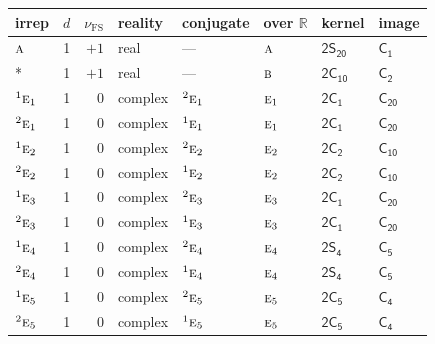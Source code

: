 \documentclass[10pt,a4paper]{article}
\numberwithin{equation}{section}
\newcommand{\grp}[1]{\mathsf{#1}}
\newcommand{\irr}[1]{\text{\normalfont\scshape #1}}
\newcommand{\conjpair}[1]{{}^{#1}}
\newcommand{\detbox}[1]{{\setlength{\fboxsep}{1pt}\fbox{#1}}}
\newcommand{\fsind}{\nu_{\mathrm{FS}}}
\begin{document}
{\small\renewcommand{\arraystretch}{1.25}\setlength{\tabcolsep}{4pt}\begin{longtable}{@{}lrrlllll@{}}\toprule
irrep & $d$ & $\fsind$ & reality & conjugate & over $\mathbb{R}$ & kernel & image\\\midrule\endhead
\bottomrule\endfoot\endlastfoot
$\irr{a}$ & 1 & $+1$ & real & --- & $\irr{a}$ & \href{2S20.pdf}{$\grp{2S_{20}}$} & \href{../../../rotation/data/pdf/C1.pdf}{$\grp{C_{1}}$}\\*
\detbox{$\irr{b}$} & 1 & $+1$ & real & --- & $\irr{b}$ & \href{2C10.pdf}{$\grp{2C_{10}}$} & \href{../../../rotation/data/pdf/C2.pdf}{$\grp{C_{2}}$}\\
$\conjpair{1}\irr{e}_{1}$ & 1 & $0$ & complex & $\conjpair{2}\irr{e}_{1}$ & $\irr{e}_{1}$ & \href{2C1.pdf}{$\grp{2C_{1}}$} & $\grp{C_{20}}$\\
$\conjpair{2}\irr{e}_{1}$ & 1 & $0$ & complex & $\conjpair{1}\irr{e}_{1}$ & $\irr{e}_{1}$ & \href{2C1.pdf}{$\grp{2C_{1}}$} & $\grp{C_{20}}$\\
$\conjpair{1}\irr{e}_{2}$ & 1 & $0$ & complex & $\conjpair{2}\irr{e}_{2}$ & $\irr{e}_{2}$ & \href{2C2.pdf}{$\grp{2C_{2}}$} & \href{../../../rotation/data/pdf/C10.pdf}{$\grp{C_{10}}$}\\
$\conjpair{2}\irr{e}_{2}$ & 1 & $0$ & complex & $\conjpair{1}\irr{e}_{2}$ & $\irr{e}_{2}$ & \href{2C2.pdf}{$\grp{2C_{2}}$} & \href{../../../rotation/data/pdf/C10.pdf}{$\grp{C_{10}}$}\\
$\conjpair{1}\irr{e}_{3}$ & 1 & $0$ & complex & $\conjpair{2}\irr{e}_{3}$ & $\irr{e}_{3}$ & \href{2C1.pdf}{$\grp{2C_{1}}$} & $\grp{C_{20}}$\\
$\conjpair{2}\irr{e}_{3}$ & 1 & $0$ & complex & $\conjpair{1}\irr{e}_{3}$ & $\irr{e}_{3}$ & \href{2C1.pdf}{$\grp{2C_{1}}$} & $\grp{C_{20}}$\\
$\conjpair{1}\irr{e}_{4}$ & 1 & $0$ & complex & $\conjpair{2}\irr{e}_{4}$ & $\irr{e}_{4}$ & \href{2S4.pdf}{$\grp{2S_{4}}$} & \href{../../../rotation/data/pdf/C5.pdf}{$\grp{C_{5}}$}\\
$\conjpair{2}\irr{e}_{4}$ & 1 & $0$ & complex & $\conjpair{1}\irr{e}_{4}$ & $\irr{e}_{4}$ & \href{2S4.pdf}{$\grp{2S_{4}}$} & \href{../../../rotation/data/pdf/C5.pdf}{$\grp{C_{5}}$}\\
$\conjpair{1}\irr{e}_{5}$ & 1 & $0$ & complex & $\conjpair{2}\irr{e}_{5}$ & $\irr{e}_{5}$ & \href{2C5.pdf}{$\grp{2C_{5}}$} & \href{../../../rotation/data/pdf/C4.pdf}{$\grp{C_{4}}$}\\
$\conjpair{2}\irr{e}_{5}$ & 1 & $0$ & complex & $\conjpair{1}\irr{e}_{5}$ & $\irr{e}_{5}$ & \href{2C5.pdf}{$\grp{2C_{5}}$} & \href{../../../rotation/data/pdf/C4.pdf}{$\grp{C_{4}}$}\\

\end{longtable}}
\end{document}
